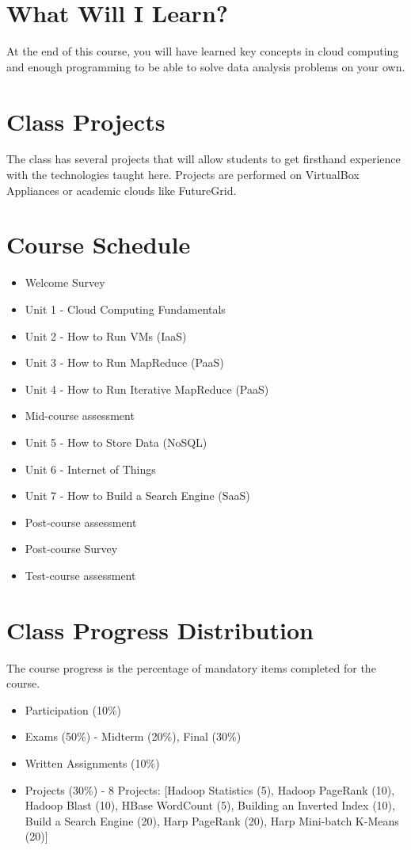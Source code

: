 \section{What Will I Learn?}
At the end of this course, you will have learned key concepts in cloud
computing and enough programming to be able to solve data analysis problems on
your own.

\section{Class Projects}
The class has several projects that will allow students to get firsthand
experience with the technologies taught here. Projects are performed on
VirtualBox Appliances or academic clouds like FutureGrid.

\section{Course Schedule}
\begin{itemize}
  \item Welcome Survey
  \item Unit 1 - Cloud Computing Fundamentals
  \item Unit 2 - How to Run VMs (IaaS)
  \item Unit 3 - How to Run MapReduce (PaaS)
  \item Unit 4 - How to Run Iterative MapReduce (PaaS)
  \item Mid-course assessment
  \item Unit 5 - How to Store Data (NoSQL)
  \item Unit 6 - Internet of Things
  \item Unit 7 - How to Build a Search Engine (SaaS)
  \item Post-course assessment
  \item Post-course Survey
  \item Test-course assessment
\end{itemize}

\section{Class Progress Distribution}

The course progress is the percentage of mandatory items completed for the course.

\begin{itemize}
  \item Participation (10\%)
  \item Exams (50\%) - Midterm (20\%), Final (30\%)
  \item Written Assignments (10\%)
  \item Projects (30\%) - 8 Projects: [Hadoop Statistics (5), Hadoop PageRank (10), Hadoop Blast (10), HBase WordCount (5), Building an Inverted Index (10), Build a Search Engine (20), Harp PageRank (20), Harp Mini-batch K-Means (20)]
\end{itemize}

